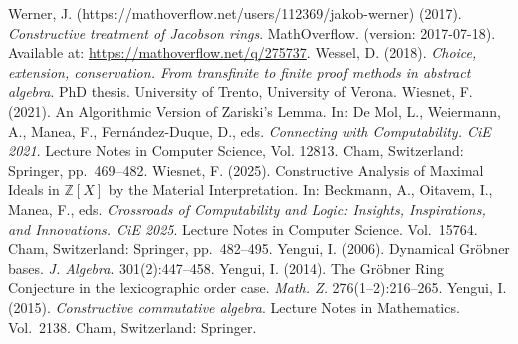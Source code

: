 \documentclass[11pt]{article}
\theoremstyle{definition}
\begin{document}
\begin{thebibliography}{99}
 Werner, J. (https://mathoverflow.net/users/112369/jakob-werner) (2017). \emph{Constructive treatment of Jacobson rings}. MathOverflow. (version: 2017-07-18). Available at: \url{https://mathoverflow.net/q/275737}.
 Wessel, D. (2018). \emph{Choice, extension, conservation. From transfinite to finite proof methods in abstract algebra}. PhD thesis. University of Trento, University of Verona.
 Wiesnet, F. (2021). An Algorithmic Version of Zariski's Lemma. In: De Mol, L., Weiermann, A., Manea, F., Fernández-Duque, D., eds. \emph{Connecting with Computability. CiE 2021}. Lecture Notes in Computer Science, Vol. 12813. Cham, Switzerland: Springer, pp.~469--482.
 Wiesnet, F. (2025). Constructive Analysis of Maximal Ideals in $\mathbb{Z}[X]$ by the Material Interpretation. In: Beckmann, A., Oitavem, I., Manea, F., eds. \emph{Crossroads of Computability and Logic: Insights, Inspirations, and Innovations. CiE 2025}. Lecture Notes in Computer Science. Vol.~15764. Cham, Switzerland: Springer, pp.~482--495.
 Yengui, I. (2006). Dynamical Gröbner bases. \emph{J. Algebra}. 301(2):447--458.
 Yengui, I. (2014). The Gröbner Ring Conjecture in the lexicographic order case. \emph{Math. Z.} 276(1--2):216--265.
 Yengui, I. (2015). \emph{Constructive commutative algebra}. Lecture Notes in Mathematics. Vol.~2138. Cham, Switzerland: Springer.
\end{thebibliography}
\end{document}
